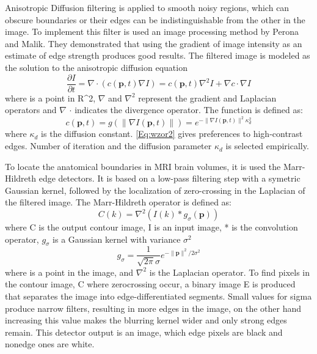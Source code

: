 Anisotropic Diffusion filtering is applied to smooth noisy regions, which can obscure boundaries or their edges can be indistinguishable from the other in the image. To implement this filter is used an image processing method by Perona and Malik. They demonstrated that using the gradient of image intensity as an estimate of edge strength produces good results. The filtered image is modeled as the solution to the anisotropic diffusion equation
\begin{equation}
    \frac{\partial I}{\partial t} = \nabla \cdot (c(\boldsymbol{p},t)\nabla I) = c(\boldsymbol{p},t)\nabla^{2}I + \nabla c \cdot \nabla I  \label{Eq:wzor1}
\end{equation}
where  is a point in R^2, $\nabla$ and $\nabla^{2}$  represent the gradient and Laplacian operators and $\nabla$ $\cdot$ indicates the divergence operator. The function is defined as:
\begin{equation}
    c(\boldsymbol{p},t) = g(\parallel\nabla I(\boldsymbol{p},t)\parallel) = e^{-\parallel\nabla I(\boldsymbol{p},t)\parallel^{2} \kappa^{2}_{d}} \label{Eq:wzor2}
\end{equation}
where $\kappa_{d}$ is the diffusion constant. \eqref{Eq:wzor2} gives preferences to high-contrast edges. Number of iteration and the diffusion parameter $\kappa_{d}$ is selected empirically.

To locate the anatomical boundaries in MRI brain volumes, it is used the Marr-Hildreth edge detectors. It is based on a low-pass filtering step with a symetric Gaussian kernel, followed by the localization of zero-crossing in the Laplacian of the filtered image. The Marr-Hildreth operator is defined as:
\begin{equation}
    C(k) = \nabla^{2}(I(k)*g_{\sigma}(\boldsymbol{p})) \label{Eq:wzor3}
\end{equation}
where C is the output contour image, I is an input image, * is the convolution operator, $g_{\sigma}$ is a Gaussian kernel with variance $\sigma^{2}$
\begin{equation}
    g_{\sigma} = \frac{1}{\sqrt{2\pi}\sigma}e^{- \parallel\boldsymbol{p}\parallel^{2}/2\sigma^{2}} \label{Eq:wzor4}
\end{equation}
where  is a point in the image, and $\nabla^{2}$ is the Laplacian operator.
To find pixels in the contour image, C where zerocrossing occur, a binary image E is produced that separates the image into edge-differentiated segments. Small values for sigma produce narrow filters, resulting in more edges in the image, on the other hand increasing this value makes the blurring kernel wider and only strong edges remain. This detector output is an image, which edge pixels are black and nonedge ones are white.

